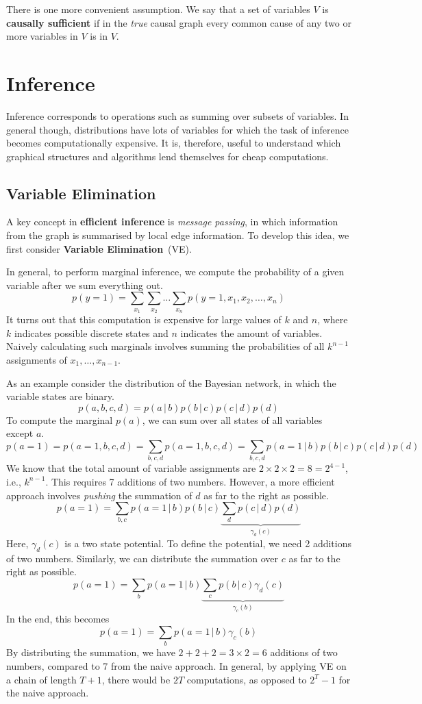 \documentclass{article}
\newcommand{\giv}{\,|\,}
\begin{document}
\noindent There is one more convenient assumption. We say that a set of variables $V$ is \textbf{causally sufficient} if in the \textit{true} causal graph every common cause of any two or more variables in $V$ is in $V$.

\newpage
\section{Inference}
Inference corresponds to operations such as summing over subsets of variables. In general though, distributions have lots of variables for which the task of inference becomes computationally expensive. It is, therefore, useful to understand which graphical structures and algorithms lend themselves for cheap computations. 

\subsection{Variable Elimination}

A key concept in \textbf{efficient inference} is \textit{message passing}, in which information from the graph is summarised by local edge information. To develop this idea, we first consider \textbf{Variable Elimination}~(VE). 

In general, to perform marginal inference, we compute the probability of a given variable after we sum everything out. 
$$
    p(y=1) = \sum_{x_1}\sum_{x_2}\dots\sum_{x_n} p(y=1, x_1, x_2, \dots, x_n)
$$
\noindent It turns out that this computation is expensive for large values of $k$ and $n$, where $k$ indicates possible discrete states and $n$ indicates the amount of variables. Naively calculating such marginals involves summing the probabilities of all $k^{n-1}$ assignments of $x_1, \dots, x_{n-1}$. 

As an example consider the distribution of the Bayesian network, in which the variable states are binary.
$$
    p(a, b, c, d) = p(a \giv b)p(b \giv c)p(c \giv d)p(d)
$$
\noindent To compute the marginal $p(a)$, we can sum over all states of all variables except $a$. 
$$
    p(a=1) = p(a=1, b, c, d) = \sum_{b, c, d} p(a=1, b, c, d) = \sum_{b, c, d} p(a=1 \giv b)p(b \giv c)p(c \giv d)p(d)
$$
\noindent We know that the total amount of variable assignments are $2 \times 2 \times 2 = 8 = 2^{4-1}$, i.e., $k^{n-1}$. This requires 7 additions of two numbers. However, a more efficient approach involves \textit{pushing} the summation of $d$ as far to the right as possible. 
$$
    p(a=1) = \sum_{b, c} p(a=1 \giv b)p(b \giv c) \underbrace{\sum_d p(c \giv d)p(d)}_{\gamma_d(c)}
$$
\noindent Here, $\gamma_d(c)$ is a two state potential. To define the potential, we need 2 additions of two numbers. Similarly, we can distribute the summation over $c$  as far to the right as possible. 
$$
    p(a=1) = \sum_{b} p(a=1 \giv b) \underbrace{\sum_{c} p(b \giv c) \gamma_d(c)}_{\gamma_c(b)}
$$
\noindent In the end, this becomes
$$
    p(a=1) = \sum_{b} p(a=1 \giv b) \gamma_c(b)
$$
\noindent By distributing the summation, we have $2+2+2 = 3 \times 2 = 6$ additions of two numbers, compared to 7 from the naive approach. In general, by applying VE on a chain of length $T+1$, there would be $2T$ computations, as opposed to $2^T - 1$ for the naive approach. 
\end{document}
